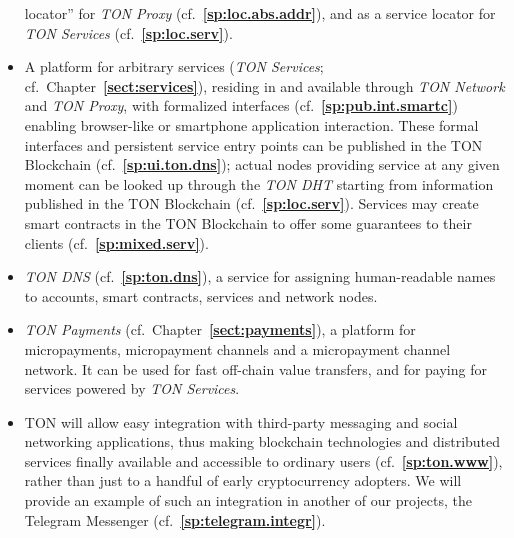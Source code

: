 \documentclass[12pt,oneside]{article}
\def\refpoint#1{{\rm\textbf{\ref{#1}}}}
\let\ptref=\refpoint
\begin{document}
\begin{English}
\begin{itemize}
      locator'' for {\em TON Proxy\/} (cf.~\ptref{sp:loc.abs.addr}), and
      as a service locator for {\em TON Services}
      (cf.~\ptref{sp:loc.serv}).
    \item A platform for arbitrary services ({\em TON Services};
      cf.\ Chapter~\ptref{sect:services}), residing in and available
      through {\em TON Network\/} and {\em TON Proxy}, with formalized
      interfaces (cf.~\ptref{sp:pub.int.smartc}) enabling browser-like or
      smartphone application interaction. These formal interfaces and
      persistent service entry points can be published in the TON
      Blockchain (cf.~\ptref{sp:ui.ton.dns}); actual nodes providing
      service at any given moment can be looked up through the {\em TON
        DHT\/} starting from information published in the TON Blockchain
      (cf.~\ptref{sp:loc.serv}). Services may create smart contracts in
      the TON Blockchain to offer some guarantees to their clients
      (cf.~\ptref{sp:mixed.serv}).
    \item {\em TON DNS\/} (cf.~\ptref{sp:ton.dns}), a service for
      assigning human-readable names to accounts, smart contracts,
      services and network nodes.
    \item {\em TON Payments\/} (cf.\ Chapter~\ptref{sect:payments}), a
      platform for micropayments, micropayment channels and a micropayment
      channel network. It can be used for fast off-chain value transfers,
      and for paying for services powered by {\em TON Services}.
    \item TON will allow easy integration with third-party messaging and
      social networking applications, thus making blockchain technologies
      and distributed services finally available and accessible to
      ordinary users (cf.~\ptref{sp:ton.www}), rather than just to a
      handful of early cryptocurrency adopters. We will provide an example
      of such an integration in another of our projects, the Telegram
      Messenger (cf.~\ptref{sp:telegram.integr}).
    \end{itemize}
\end{English}
\end{document}
